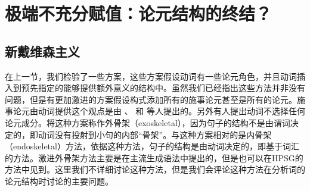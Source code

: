 \section{极端不充分赋值：论元结构的终结？}
\label{radical-sec}

\subsection{新戴维森主义}

在上一节，我们检验了一些方案，这些方案假设动词有一些论元角色，并且动词插入到预先指定的能够提供额外意义的结构中。虽然我们已经指出这些方法并非没有问题，但是有更加激进的方案假设构式添加所有的施事论元甚至是所有的论元。施事论元由动词提供这个观点是由 \citet{Marantz84a, Marantz97a}、 \citet{Kratzer96a}和 \citet{Embick2004a}等人提出的。另外有人提出动词不选择任何论元成分。\citet{Borer2003a-u}将这种方案称作外骨架（exoskeletal），因为句子的结构不是由谓词决定的，即动词没有投射到小句的内部“骨架”。与这种方案相对的是内骨架（endoskeletal）方法，依据这种方法，句子的结构是由动词决定的，即基于词汇的方法。激进外骨架方法主要是在主流生成语法\citep{Borer94a-u,Borer2003a-u,Borer2005a-u,Schein93a-u,HK97a-u,Lohndal2012a}中提出的，但是也可以在HPSG的方法中见到\citep{Haugereid2009a}。这里我们不详细讨论这种方法，但是我们会评论这种方法在分析词的论元结构时讨论的主要问题。

